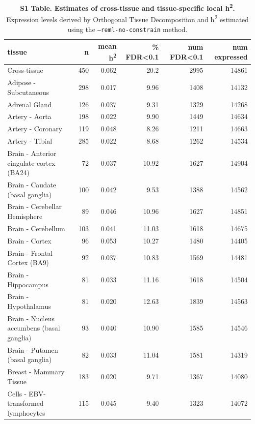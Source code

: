\documentclass[10pt,letterpaper]{article}
\begin{document}
\begin{table}[!ht]
\begin{adjustwidth}{-2.25in}{0in} %
\caption*{{\bf S1 Table. Estimates of cross-tissue and tissue-specific local h\textsuperscript{2}.} Expression levels derived by Orthogonal Tissue Decomposition and h\textsuperscript{2} estimated using the \texttt{--reml-no-constrain} method.}
\centering
\begin{tabular}{lrrrrr}
  \hline
tissue & n & mean h\textsuperscript{2} & \% FDR\textless{}0.1 & num FDR\textless{}0.1 & num expressed \\ 
  \hline
 Cross-tissue & 450 & 0.062 & 20.2 & 2995 & 14861 \\ 
   Adipose - Subcutaneous & 298 & 0.017 & 9.96 & 1408 & 14132 \\ 
   Adrenal Gland & 126 & 0.037 & 9.31 & 1329 & 14268 \\ 
   Artery - Aorta & 198 & 0.022 & 9.90 & 1449 & 14634 \\ 
   Artery - Coronary & 119 & 0.048 & 8.26 & 1211 & 14663 \\ 
   Artery - Tibial & 285 & 0.022 & 8.68 & 1262 & 14534 \\ 
   Brain - Anterior cingulate cortex (BA24) & 72 & 0.037 & 10.92 & 1627 & 14904 \\ 
   Brain - Caudate (basal ganglia) & 100 & 0.042 & 9.53 & 1388 & 14562 \\ 
   Brain - Cerebellar Hemisphere & 89 & 0.046 & 10.96 & 1627 & 14851 \\ 
   Brain - Cerebellum & 103 & 0.041 & 11.03 & 1618 & 14675 \\ 
   Brain - Cortex & 96 & 0.053 & 10.27 & 1480 & 14405 \\ 
   Brain - Frontal Cortex (BA9) & 92 & 0.037 & 10.83 & 1569 & 14481 \\ 
   Brain - Hippocampus & 81 & 0.033 & 11.16 & 1618 & 14504 \\ 
   Brain - Hypothalamus & 81 & 0.020 & 12.63 & 1839 & 14563 \\ 
   Brain - Nucleus accumbens (basal ganglia) & 93 & 0.040 & 10.90 & 1585 & 14546 \\ 
   Brain - Putamen (basal ganglia) & 82 & 0.033 & 11.04 & 1581 & 14319 \\ 
   Breast - Mammary Tissue & 183 & 0.020 & 9.71 & 1367 & 14080 \\ 
   Cells - EBV-transformed lymphocytes & 115 & 0.045 & 9.40 & 1323 & 14072 \\ 

\end{tabular}
\end{adjustwidth}
\end{table}
\end{document}
